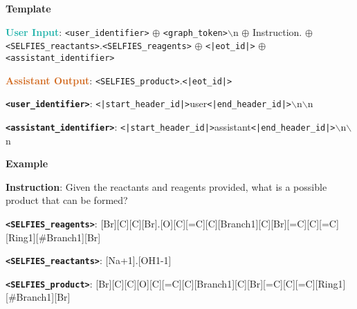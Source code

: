 \begin{tcolorbox}[colback=white!98!black,colframe=white!30!black,boxsep=1.1pt,top=6.75pt]%
\scriptsize
\noindent\makebox[\textwidth]{\rule{\textwidth}{1pt}}
\textbf{Template}
\\[-0.575em]
\noindent\makebox[\textwidth]{\rule{\textwidth}{1pt}}

\textbf{\textcolor[HTML]{20B2AA}{User Input}}: {\tt <user\_identifier>} $\oplus$ {\tt <graph\_token>}$\backslash$n $\oplus$ Instruction. $\oplus$ {\tt <SELFIES\_reactants>}.{\tt <SEL\-FIES\_reagents>} $\oplus$ {\tt <|eot\_id|>} $\oplus$ {\tt <assistant\_identifier>}

\textbf{\textcolor[HTML]{D2691E}{Assistant Output}}: {\tt <SELFIES\_product>}.{\tt <|eot\_id|>}

{\tt \textbf{<user\_identifier>}}: {\tt <|start\_header\_id|>}user{\tt <|end\_header\_id|>}$\backslash$n$\backslash$n

{\tt \textbf{<assistant\_identifier>}}: {\tt <|start\_header\_id|>}assistant{\tt <|end\_header\_id|>}$\backslash$n$\backslash$n

\noindent\makebox[\textwidth]{\rule{\textwidth}{1pt}}
\textbf{Example}
\\[-0.575em]
\noindent\makebox[\textwidth]{\rule{\textwidth}{1pt}}

\begin{tcolorbox}[colback=cyan!7!white,colframe=white!98!black,boxsep=1.1pt,top=6.75pt]
\textbf{Instruction}: Given the reactants and reagents provided, what is a possible product that can be formed? 

{\tt \textbf{<SELFIES\_reagents>}}: [Br][C][C][Br].[O][C][=C][C][Branch1][C][Br][=C][C][=C][Ring1][\#Branch1][Br]

{\tt \textbf{<SELFIES\_reactants>}}: [Na+1].[OH1-1]
\end{tcolorbox}

\begin{tcolorbox}[colback=orange!7!white,colframe=white!98!black,boxsep=1.1pt,top=6.75pt]
{\tt \textbf{<SELFIES\_product>}}: [Br][C][C][O][C][=C][C][Branch1][C][Br][=C][C][=C][Ring1][\#Branch1][Br]
\end{tcolorbox}

\end{tcolorbox}



